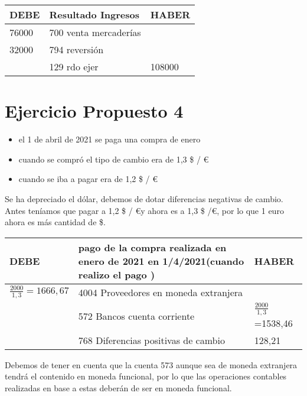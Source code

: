 \documentclass[a4paper,12pt]{article}
\newcommand{\bancos}{572 Bancos cuenta corriente}
\newcommand{\myequation}[2]{\ensuremath{\frac{#1}{#2}}}
\newcommand{\mytcolorbox}[1]{
    \begin{tcolorbox}[colback=blue!5!white, colframe=blue!75!black, title=NOTA]
        #1
    \end{tcolorbox}
}
\begin{document}
\begin{table}[H]
    \centering
    \begin{tabular}{|p{3cm}|p{6cm}|p{3cm}|}
    \hline
    \textbf{DEBE} & \textbf{Resultado Ingresos} & \textbf{HABER} \\
    \hline
    76000& 700 venta mercaderías& \\
    \hline
    32000 &794 reversión & \\
    \hline
    & 129 rdo ejer& 108000\\
    \hline
    \end{tabular}
\end{table}

\section{Ejercicio Propuesto 4}

\begin{itemize}
    \item el 1 de abril de 2021 se paga una compra de enero
    \item cuando se compró el tipo de cambio era de 1,3 \$ / \euro
    \item cuando se iba a pagar era de 1,2 \$ / \euro
\end{itemize}
Se ha depreciado el dólar, debemos de dotar diferencias negativas de cambio.
Antes teníamos que pagar a 1,2 \$ / \euro y ahora es a 1,3 \$ /\euro, por lo que 1 euro ahora es más cantidad de \$.

\begin{table}[H]
    \centering
    \begin{tabular}{|p{3cm}|p{6cm}|p{3cm}|}
    \hline
    \textbf{DEBE} & \textbf{pago de la compra realizada en enero de 2021 en 1/4/2021(cuando realizo el pago ) } & \textbf{HABER} \\
    \hline
    $\frac{2000}{1,3} = 1666,67$& 4004 Proveedores en moneda extranjera& \\
    \hline
    & \bancos & \myequation{2000}{1,3}=1538,46\\
    \hline
    & 768 Diferencias positivas de cambio& 128,21\\
    \hline
    \end{tabular}
\end{table}

\mytcolorbox{Debemos de tener en cuenta que la cuenta 573 aunque sea de moneda extranjera tendrá el contenido en moneda funcional, por lo que las operaciones contables realizadas en base a estas deberán de ser en moneda funcional.}
\end{document}
